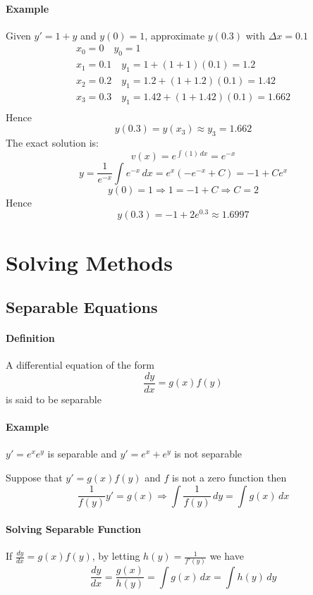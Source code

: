 \documentclass[12pt]{article}
\begin{document}
\paragraph{Example} Given $y' = 1 + y$ and $y(0) = 1$, approximate $y(0.3)$ with $\Delta x = 0.1$
\begin{align*} 
     x_0 = 0 \quad y_0 = 1 \\
     x_1 = 0.1 \quad y_1 = 1 + (1 + 1)(0.1) = 1.2 \\
     x_2 = 0.2 \quad y_1 = 1.2 + (1 + 1.2)(0.1) = 1.42 \\
     x_3 = 0.3 \quad y_1 = 1.42 + (1 + 1.42)(0.1) = 1.662 \\
\end{align*}
Hence
\[
    y(0.3) = y(x_3) \approx y_3 = 1.662
\]
The exact solution is:
\[
    v(x) = e^{\int ( 1) \, dx} = e^{ -x}
\]
\[
    y = \frac{1}{e^{ - x}} \int e^{ - x} \, dx = e^x( -e^{- x} + C) = - 1 + Ce^x
\]
\[
    y(0) = 1 \Rightarrow 1 = - 1 + C \Rightarrow C = 2
\]
Hence
\[
    y(0.3) = - 1 + 2e^{0.3} \approx 1.6997
\]
\section{Solving Methods}
\subsection{Separable Equations}
\paragraph{Definition}
A differential equation of the form 
\[
    \frac{dy}{dx} = g(x)f(y)
\]
is said to be separable

\paragraph{Example} $y' = e^xe^y$ is separable and $y' = e^x + e^y$ is not separable

\noindent
Suppose that $y' = g(x)f(y)$ and $f$ is not a zero function then
\[
    \frac{1}{f(y)} y' = g(x) \Rightarrow \int \frac{1}{f(y)} \, dy = \int g(x) \, dx
\]

\paragraph{Solving Separable Function} If $\frac{dy}{dx} = g(x)f(y)$, by letting $h(y) = \frac{1}{f'(y)}$ we have
\[
    \frac{dy}{dx} = \frac{g(x)}{h(y)} = \int g(x) \, dx = \int h(y) \, dy
\]
\end{document}
